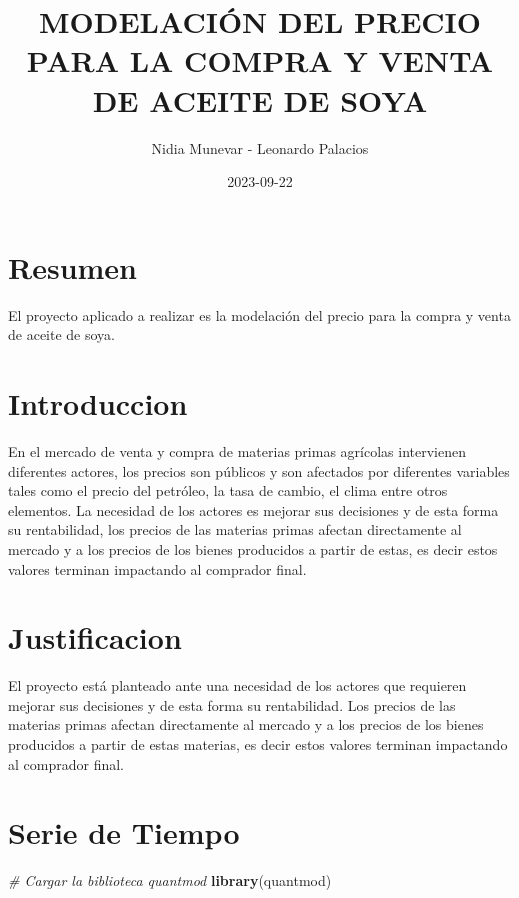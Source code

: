 \documentclass[
]{book}
\title{MODELACIÓN DEL PRECIO PARA LA COMPRA Y VENTA DE ACEITE DE SOYA}
\author{Nidia Munevar - Leonardo Palacios}
\date{2023-09-22}
\newenvironment{Shaded}{\begin{snugshade}}{\end{snugshade}}
\newcommand{\CommentTok}[1]{\textcolor[rgb]{0.56,0.35,0.01}{\textit{#1}}}
\newcommand{\FunctionTok}[1]{\textcolor[rgb]{0.13,0.29,0.53}{\textbf{#1}}}
\newcommand{\NormalTok}[1]{#1}
\begin{document}
\maketitle

{
\setcounter{tocdepth}{1}
\tableofcontents
}
\hypertarget{resumen}{%
\chapter{Resumen}\label{resumen}}

El proyecto aplicado a realizar es la modelación del precio para la compra y venta de aceite de soya.

\hypertarget{introduccion}{%
\chapter{Introduccion}\label{introduccion}}

En el mercado de venta y compra de materias primas agrícolas intervienen diferentes actores, los precios son públicos y son afectados por diferentes variables tales como el precio del petróleo, la tasa de cambio, el clima entre otros elementos. La necesidad de los actores es mejorar sus decisiones y de esta forma su rentabilidad, los precios de las materias primas afectan directamente al mercado y a los precios de los bienes producidos a partir de estas, es decir estos valores terminan impactando al comprador final.

\hypertarget{justificacion}{%
\chapter{Justificacion}\label{justificacion}}

El proyecto está planteado ante una necesidad de los actores que requieren mejorar sus decisiones y de esta forma su rentabilidad. Los precios de las materias primas afectan directamente al mercado y a los precios de los bienes producidos a partir de estas materias, es decir estos valores terminan impactando al comprador final.

\hypertarget{serie-de-tiempo}{%
\chapter{Serie de Tiempo}\label{serie-de-tiempo}}

\begin{Shaded}
\begin{Highlighting}[]
\CommentTok{\# Cargar la biblioteca quantmod}
\FunctionTok{library}\NormalTok{(quantmod)}
\end{Highlighting}
\end{Shaded}
\end{document}
